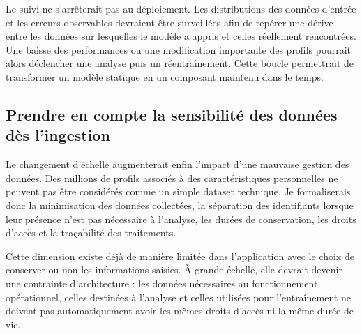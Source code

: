 Le suivi ne s'arrêterait pas au déploiement. Les distributions des données d'entrée et les erreurs observables devraient être surveillées afin de repérer une dérive entre les données sur lesquelles le modèle a appris et celles réellement rencontrées. Une baisse des performances ou une modification importante des profils pourrait alors déclencher une analyse puis un réentraînement. Cette boucle permettrait de transformer un modèle statique en un composant maintenu dans le temps.

\subsection{Prendre en compte la sensibilité des données dès l'ingestion}

Le changement d'échelle augmenterait enfin l'impact d'une mauvaise gestion des données. Des millions de profils associés à des caractéristiques personnelles ne peuvent pas être considérés comme un simple dataset technique. Je formaliserais donc la minimisation des données collectées, la séparation des identifiants lorsque leur présence n'est pas nécessaire à l'analyse, les durées de conservation, les droits d'accès et la traçabilité des traitements.

Cette dimension existe déjà de manière limitée dans l'application avec le choix de conserver ou non les informations saisies. À grande échelle, elle devrait devenir une contrainte d'architecture : les données nécessaires au fonctionnement opérationnel, celles destinées à l'analyse et celles utilisées pour l'entraînement ne doivent pas automatiquement avoir les mêmes droits d'accès ni la même durée de vie.

